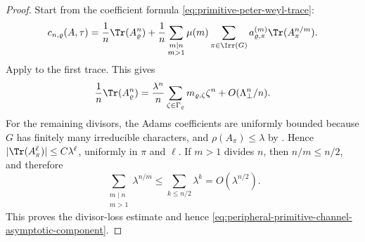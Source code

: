 \begin{proof}
  Start from the coefficient formula
  \eqref{eq:primitive-peter-weyl-trace}:
  \[
    c_{n,\varrho}(A,\tau)
    =
    \frac{1}{n}\Tr(A_\varrho^n)
    +
    \frac{1}{n}\sum_{\substack{m\mid n\\m>1}}\mu(m)
      \sum_{\pi\in\Irr(G)}
        a_{\varrho,\pi}^{(m)}\Tr(A_\pi^{n/m}).
  \]
  Apply  to the first trace.
  This gives
  \[
    \frac{1}{n}\Tr(A_\varrho^n)
    =
    \frac{\lambda^n}{n}
      \sum_{\zeta\in\Gamma_\varrho}m_{\varrho,\zeta}\zeta^n
    +O(\Lambda_\perp^n/n).
  \]
  For the remaining divisors, the Adams coefficients are uniformly bounded
  because \(G\) has finitely many irreducible characters, and
  \(\rho(A_\pi)\le\lambda\) by
  .  Hence
  \(|\Tr(A_\pi^\ell)|\le C\lambda^\ell\), uniformly in \(\pi\) and
  \(\ell\).  If \(m>1\) divides \(n\), then \(n/m\le n/2\), and therefore
  \[
    \sum_{\substack{m\mid n\\m>1}}\lambda^{n/m}
    \le \sum_{k\le n/2}\lambda^k
    =O(\lambda^{n/2}).
  \]
  This proves the divisor-loss estimate and hence
  \eqref{eq:peripheral-primitive-channel-asymptotic-component}.
\end{proof}

